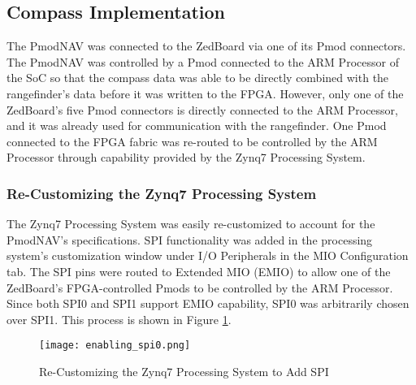 \subsection{Compass Implementation}
The PmodNAV was connected to the ZedBoard via one of its Pmod connectors. The PmodNAV was controlled by a Pmod connected to the ARM Processor of the SoC so that the compass data was able to be directly combined with the rangefinder's data before it was written to the FPGA. However, only one of the ZedBoard's five Pmod connectors is directly connected to the ARM Processor, and it was already used for communication with the rangefinder. One Pmod connected to the FPGA fabric was re-routed to be controlled by the ARM Processor through capability provided by the Zynq7 Processing System.

\subsubsection{Re-Customizing the Zynq7 Processing System}
The Zynq7 Processing System was easily re-customized to account for the PmodNAV's specifications. SPI functionality was added in the processing system's customization window under I/O Peripherals in the MIO Configuration tab. The SPI pins were routed to Extended MIO (EMIO) to allow one of the ZedBoard's FPGA-controlled Pmods to be controlled by the ARM Processor. Since both SPI0 and SPI1 support EMIO capability, SPI0 was arbitrarily chosen over SPI1. This process is shown in Figure \ref{enabling_spi0}.

\begin{figure}[H]
	\centerline{\texttt{[image: enabling\_spi0.png]}}
	\caption{Re-Customizing the Zynq7 Processing System to Add SPI}
	\label{enabling_spi0}
\end{figure}





